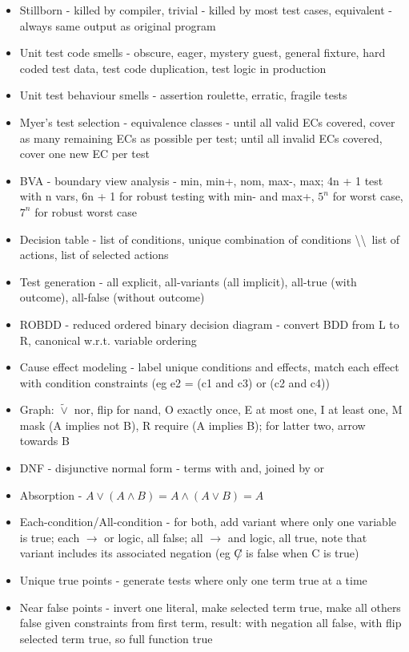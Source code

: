 \documentclass[10pt]{article}
\begin{document}
\begin{multicols}{2}
\begin{itemize}
        \item Stillborn - killed by compiler, trivial - killed by most test cases, equivalent - always same output as original program
        \item Unit test code smells - obscure, eager, mystery guest, general fixture, hard coded test data, test code duplication, test logic in production
        \item Unit test behaviour smells - assertion roulette, erratic, fragile tests
        \item Myer's test selection - equivalence classes - until all valid ECs covered, cover as many remaining ECs as possible per test; until all invalid ECs covered, cover one new EC per test
        \item BVA - boundary view analysis - min, min+, nom, max-, max; 4n + 1 test with n vars, 6n + 1 for robust testing with min- and max+, $5^n$ for worst case, $7^n$ for robust worst case
        \item Decision table - list of conditions, unique combination of conditions \textbackslash\textbackslash \, list of actions, list of selected actions
        \item Test generation - all explicit, all-variants (all implicit), all-true (with outcome), all-false (without outcome)
        \item ROBDD - reduced ordered binary decision diagram - convert BDD from L to R, canonical w.r.t. variable ordering
        \item Cause effect modeling - label unique conditions and effects, match each effect with condition constraints (eg e2 = (c1 and c3) or (c2 and c4))
        \item Graph: $\widetilde{\vee}$ nor, flip for nand, O exactly once, E at most one, I at least one, M mask (A implies not B), R require (A implies B); for latter two, arrow towards B 
        \item DNF - disjunctive normal form - terms with and, joined by or 
        \item Absorption - $A \vee (A \wedge B) = A \wedge (A \vee B) = A$
        \item Each-condition/All-condition - for both, add variant where only one variable is true; each $\rightarrow$ or logic, all false; all $\rightarrow$ and logic, all true, note that variant includes its associated negation (eg $\not C$ is false when C is true)
        \item Unique true points - generate tests where only one term true at a time
        \item Near false points - invert one literal, make selected term true, make all others false given constraints from first term, result: with negation all false, with flip selected term true, so full function true

\end{itemize}
\end{multicols}
\end{document}

